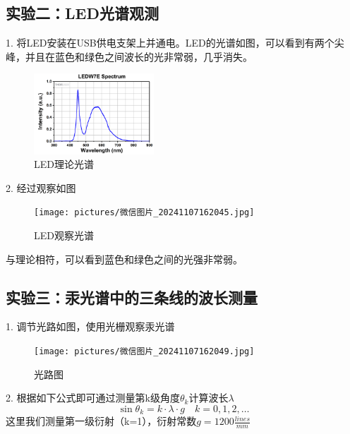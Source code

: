 \documentclass{ctexart}
\begin{document}
\subsection{实验二：LED光谱观测}
1. 将LED安装在USB供电支架上并通电。LED的光谱如图，可以看到有两个尖峰，并且在蓝色和绿色之间波长的光非常弱，几乎消失。
\begin{figure}[H]
    \centering
    \includegraphics[width=0.4\textwidth,height=0.2\textwidth]{pictures/光谱图.png}
    \caption{LED理论光谱}
\end{figure}

2. 经过观察如图
\begin{figure}[H]
    \centering
    \texttt{[image: pictures/微信图片\_20241107162045.jpg]}
    \caption{LED观察光谱}
\end{figure}
与理论相符，可以看到蓝色和绿色之间的光强非常弱。

\subsection{实验三：汞光谱中的三条线的波长测量}
1. 调节光路如图，使用光栅观察汞光谱
\begin{figure}[H]
    \centering
    \texttt{[image: pictures/微信图片\_20241107162049.jpg]}
    \caption{光路图}
\end{figure}

2. 根据如下公式即可通过测量第k级角度$\theta_k$计算波长$\lambda$
\begin{equation}
    \sin \theta_k = k \cdot \lambda \cdot g \quad k=0,1,2,\ldots
\end{equation}
这里我们测量第一级衍射（k=1），衍射常数$g=1200  \frac{lines}{mm}$
\end{document}
